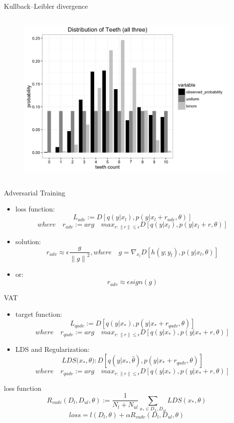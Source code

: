 \begin{frame}[fragile]{Kullback–Leibler divergence}
\begin{columns}[onlytextwidth]
\begin{figure}
			\includegraphics[height=0.5\textheight]{f5.png}
		\end{figure}
		
	\end{columns}
	
\end{frame}

\begin{frame}[fragile]{Adversarial Training}
	\begin{itemize}
		\item loss function:
		\[
		L_{adv}:=D[q(y|x_l),p(y|x_l+r_{adv},\theta)] 
		\]
		\[	where\quad  r_{adv}:=arg\quad max_{r:\|r\|\leqslant \epsilon} \mathit{D}[q(y|x_l),p(y|x_l+r, \theta)]
		\]
		\item solution:
		\[
		r_{adv}\approx \epsilon\frac{g}{{\|g\|}^2},where \quad g=\nabla_{x_l}\mathit{D}[h(y;y_l),p(y|x_l, \theta)]
		\]
		\item or:
		\[
		r_{adv}\approx \epsilon \mathit{sign(g)}
		\]
	\end{itemize}
\end{frame}

\begin{frame}[fragile]{VAT}
	\begin{itemize}
		\item target function:
		\[
		L_{qadv}:=D[q(y|x_*),p(y|x_*+r_{qadv},\theta)] 
		\]
		\[	where\quad  r_{qadv}:=arg\quad max_{r:\|r\|\leqslant \epsilon} \mathit{D}[q(y|x_*),p(y|x_*+r, \theta)]
		\]
		\item LDS and Regularization:
		\[
			\mathit{LDS(x_*},\theta):D[q(y|x_*,\widehat{\theta}),p(y|x_*+r_{qadv},\theta)]
		\]
		\[
		  where\quad  r_{qadv}:=arg\quad max_{r:\|r\|\leqslant \epsilon} \mathit{D}[q(y|x_*),p(y|x_*+r, \theta)]
		\]
		
 
	\end{itemize}
\end{frame}
\begin{frame}[fragile]{loss function}
	\[
	R_{vadv}(D_l,D_{ul},\theta):=\frac{1}{N_l+N_{ul}}\sum_{x_*\in D_L,D_{ul}}^{}LDS(x_*,\theta)
	\]
	\[
		\mathit{loss}=l(D_l,\theta)+\alpha R_{vadv}(D_l,D_{ul},\theta)
	\]
	
	
\end{frame}



